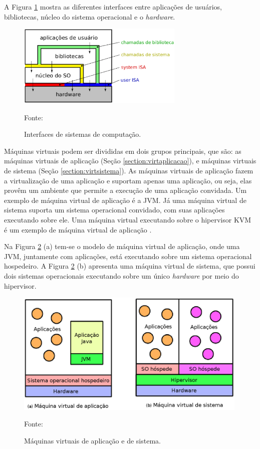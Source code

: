 A Figura \ref{fig:interfaces_isa} mostra as diferentes interfaces entre aplicações de usuários, bibliotecas, núcleo do sistema operacional e o 
\textit{hardware}.

\begin{figure}[h!]
 \centering
 \includegraphics[width=300px]{img/interfaces_isa.eps}
 \caption{Interfaces de sistemas de computação.}
 \label{fig:interfaces_isa}
 Fonte: \citet{maziero2013}
\end{figure}

Máquinas virtuais podem ser divididas em dois grupos principais, que são: as máquinas virtuais de aplicação (Seção \ref{section:virtaplicacao}), 
e máquinas virtuais de sistema (Seção \ref{section:virtsistema}). As máquinas virtuais de aplicação fazem a virtualização de uma aplicação e 
suportam apenas uma aplicação, ou seja, elas provêm um ambiente que permite a execução de uma aplicação convidada. Um exemplo de máquina 
virtual de aplicação é a \ac{JVM}. Já uma máquina virtual de sistema suporta um sistema operacional convidado, com suas aplicações executando 
sobre ele. Uma máquina virtual executando sobre o hipervisor \ac{KVM} é um exemplo de máquina virtual de aplicação \cite{laureano2008}.

Na Figura \ref{fig:vms_tipos} (a) tem-se o modelo de máquina virtual de aplicação, onde uma \ac{JVM}, juntamente com aplicações, está executando 
sobre um sistema operacional hospedeiro. A Figura \ref{fig:vms_tipos} (b) apresenta uma máquina virtual de sistema, que possui dois sistemas 
operacionais executando sobre um único \textit{hardware} por meio do hipervisor.

\begin{figure}[h!]
 \centering
 \includegraphics[width=420px]{img/vms_tipos.eps}
 \caption{Máquinas virtuais de aplicação e de sistema.}
 \label{fig:vms_tipos}
 Fonte: \citet{laureano2008}
\end{figure}

